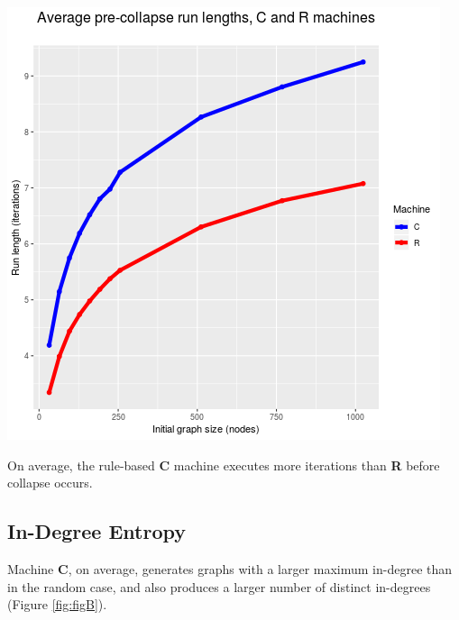 \documentclass{tufte-handout}
\begin{document}
\begin{marginfigure}
  \includegraphics{figA.png}
  \caption{On average, the rule-based \textbf{C} machine executes more iterations than \textbf{R} before collapse occurs.}
  \label{fig:figA}
\end{marginfigure}

\subsection{In-Degree Entropy}

Machine \textbf{C}, on average, generates graphs with a larger 
maximum in-degree than in the random case, and also produces a
larger number of distinct in-degrees (Figure \ref{fig:figB}).
\end{document}
